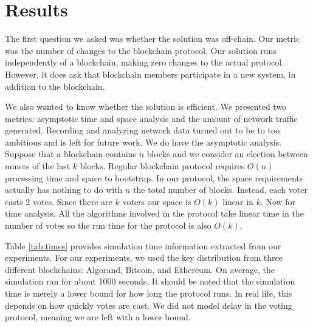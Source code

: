 \section{Results}
\label{sec:results}



The first question we asked was whether the solution was off-chain.
Our metric was the number of changes to the blockchain protocol. 
Our solution runs independently of a blockchain, making zero changes to the actual protocol.
However, it does ask that blockchain members participate in a new system, in addition to the blockchain. 


We also wanted to know whether the solution is efficient.
We presented two metrics: asymptotic time and space analysis and the amount of network traffic generated.
Recording and analyzing network data turned out to be to too ambitious and is left for future work.
We do have the asymptotic analysis.
Suppose that a blockchain contains $n$ blocks and we consider an election between miners of the last $k$ blocks.
Regular blockchain protocol requires $O(n)$ processing time and space to bootstrap.
In our protocol, the space requirements actually has nothing to do with $n$ the total number of blocks.
Instead, each voter casts 2 votes.
Since there are $k$ voters our space is $O(k)$ linear in $k$.
Now for time analysis.
All the algorithms involved in the protocol take linear time in the number of votes so the run time for the protocol is also $O(k)$.



Table \ref{tab:times} provides simulation time information extracted from our experiments.
For our experiments, we used the key distribution from three different blockchains: Algorand, Bitcoin, and Ethereum.
On average, the simulation ran for about 1000 seconds.
It should be noted that the simulation time is merely a lower bound for how long the protocol runs.
In real life, this depends on how quickly votes are cast.
We did not model delay in the voting protocol, meaning we are left with a lower bound.


